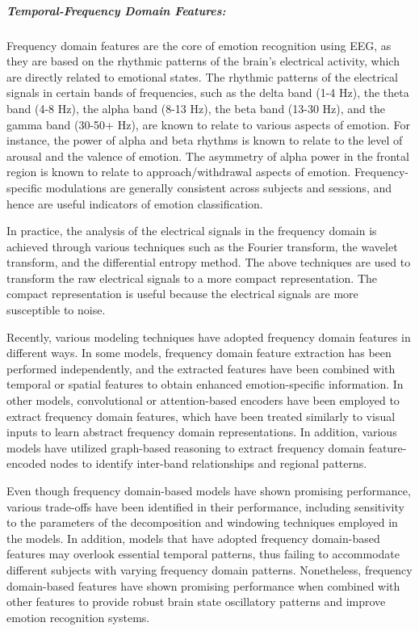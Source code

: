 \documentclass{WileyMSP-template}
\begin{document}
\subparagraph{Temporal-Frequency Domain Features:}
Frequency domain features are the core of emotion recognition using EEG, as they are based on the rhythmic patterns of the brain's electrical activity, which are directly related to emotional states. The rhythmic patterns of the electrical signals in certain bands of frequencies, such as the delta band (1-4 Hz), the theta band (4-8 Hz), the alpha band (8-13 Hz), the beta band (13-30 Hz), and the gamma band (30-50+ Hz), are known to relate to various aspects of emotion. For instance, the power of alpha and beta rhythms is known to relate to the level of arousal and the valence of emotion. The asymmetry of alpha power in the frontal region is known to relate to approach/withdrawal aspects of emotion. Frequency-specific modulations are generally consistent across subjects and sessions, and hence are useful indicators of emotion classification.

In practice, the analysis of the electrical signals in the frequency domain is achieved through various techniques such as the Fourier transform, the wavelet transform, and the differential entropy method. The above techniques are used to transform the raw electrical signals to a more compact representation. The compact representation is useful because the electrical signals are more susceptible to noise.

Recently, various modeling techniques have adopted frequency domain features in different ways. In some models, frequency domain feature extraction has been performed independently, and the extracted features have been combined with temporal or spatial features to obtain enhanced emotion-specific information. In other models, convolutional or attention-based encoders have been employed to extract frequency domain features, which have been treated similarly to visual inputs to learn abstract frequency domain representations. In addition, various models have utilized graph-based reasoning to extract frequency domain feature-encoded nodes to identify inter-band relationships and regional patterns.

Even though frequency domain-based models have shown promising performance, various trade-offs have been identified in their performance, including sensitivity to the parameters of the decomposition and windowing techniques employed in the models. In addition, models that have adopted frequency domain-based features may overlook essential temporal patterns, thus failing to accommodate different subjects with varying frequency domain patterns. Nonetheless, frequency domain-based features have shown promising performance when combined with other features to provide robust brain state oscillatory patterns and improve emotion recognition systems.
\end{document}
